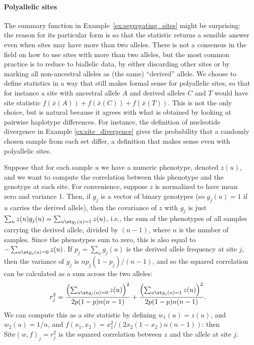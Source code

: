 \documentclass{article}
\newcommand{\site}{\mbox{Site}} %
\newcommand{\iw}{w} %
\newcommand{\aw}{{\bar x}} %
\begin{document}
\paragraph{Polyallelic sites}
The summary function in Example~\ref{ex:segregating_sites} might be surprising:
the reason for its particular form is so that the statistic returns a sensible answer
even when sites may have more than two alleles.
There is not a consensus in the field
on how to use sites with more than two alleles, but the most common practice is
to reduce to biallelic data, by either discarding other sites
or by marking all non-ancestral alleles as (the same) ``derived'' allele.
We choose to define statistics in a way that still makes formal sense for polyallelic sites,
so that for instance a site with ancestral allele $A$ and derived alleles $C$ and $T$
would have site statistic $f(\aw(A)) + f(\aw(C)) + f(\aw(T))$.
This is not the only choice, but is natural because it agrees with what is obtained by
looking at pairwise haplotype differences.
For instance, the definition of nucleotide divergence in Example \ref{ex:site_divergence}
gives the probability that a randomly chosen sample from each set differ,
a definition that makes sense even with polyallelic sites.


\begin{example} \label{ex:site_correlations}
    Suppose that for each sample $u$ we have a numeric phenotype, denoted $z(u)$,
    and we want to compute the correlation between this phenotype
    and the genotype at each site.
    For convenience, suppose $z$ is normalized
    to have mean zero and variance 1.
    Then, if $g_j$ is a vector of binary genotypes (so $g_j(u) = 1$ if $u$ carries the derived allele),
    then the covariance of $z$ with $g_j$ is just $\sum_u z(u) g_j(u) = \sum_{u \st g_j(u) = 1} z(u)$,
    i.e., the sum of the phenotypes of all samples carrying the derived allele,
    divided by $(n - 1)$, where $n$ is the number of samples.
    Since the phenotypes sum to zero, this is also equal to
    $- \sum_{u \st g_j(u) = 0} z(u)$.
    If $p_j = \sum_u g_j(u)$ is the derived allele frequency at site $j$,
    then the variance of $g_j$ is $n p_j (1-p_j) / (n-1)$,
    and so the squared correlation can be calculated as a sum across the two alleles:
    \begin{align*}
        r_j^2 =
        \frac{\left( \sum_{u \st g_j(u) = 0} z(u)\right)^2}{2p(1-p)n(n-1)}
        + \frac{\left( \sum_{u \st g_j(u) = 1} z(u)\right)^2}{2p(1-p)n(n-1)}  .
    \end{align*}
    We can compute this as a site statistic by defining $\iw_{1}(u) = z(u)$, and $\iw_{2}(u) = 1/n$,
    and $f(x_1, x_2) = x_1^2 / (2 x_2 (1 - x_2) n (n-1))$:
    then $\site(\iw, f)_j = r_j^2$ is the squared correlation between $z$ and the allele at site $j$.
\end{example}
\end{document}
